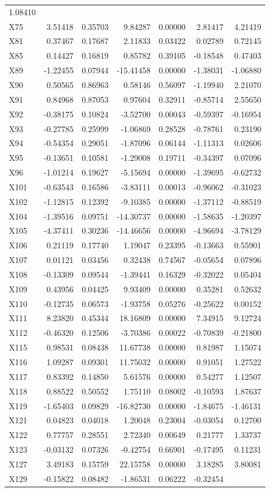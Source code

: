 \documentclass[
]{article}
\begin{document}
\begin{longtable}[]{@{}lrrrrrr@{}}
1.08410\tabularnewline
X75 & 3.51418 & 0.35703 & 9.84287 & 0.00000 & 2.81417 &
4.21419\tabularnewline
X81 & 0.37467 & 0.17687 & 2.11833 & 0.03422 & 0.02789 &
0.72145\tabularnewline
X85 & 0.14427 & 0.16819 & 0.85782 & 0.39105 & -0.18548 &
0.47403\tabularnewline
X89 & -1.22455 & 0.07944 & -15.41458 & 0.00000 & -1.38031 &
-1.06880\tabularnewline
X90 & 0.50565 & 0.86963 & 0.58146 & 0.56097 & -1.19940 &
2.21070\tabularnewline
X91 & 0.84968 & 0.87053 & 0.97604 & 0.32911 & -0.85714 &
2.55650\tabularnewline
X92 & -0.38175 & 0.10824 & -3.52700 & 0.00043 & -0.59397 &
-0.16954\tabularnewline
X93 & -0.27785 & 0.25999 & -1.06869 & 0.28528 & -0.78761 &
0.23190\tabularnewline
X94 & -0.54354 & 0.29051 & -1.87096 & 0.06144 & -1.11313 &
0.02606\tabularnewline
X95 & -0.13651 & 0.10581 & -1.29008 & 0.19711 & -0.34397 &
0.07096\tabularnewline
X96 & -1.01214 & 0.19627 & -5.15694 & 0.00000 & -1.39695 &
-0.62732\tabularnewline
X101 & -0.63543 & 0.16586 & -3.83111 & 0.00013 & -0.96062 &
-0.31023\tabularnewline
X102 & -1.12815 & 0.12392 & -9.10385 & 0.00000 & -1.37112 &
-0.88519\tabularnewline
X104 & -1.39516 & 0.09751 & -14.30737 & 0.00000 & -1.58635 &
-1.20397\tabularnewline
X105 & -4.37411 & 0.30236 & -14.46656 & 0.00000 & -4.96694 &
-3.78129\tabularnewline
X106 & 0.21119 & 0.17740 & 1.19047 & 0.23395 & -0.13663 &
0.55901\tabularnewline
X107 & 0.01121 & 0.03456 & 0.32438 & 0.74567 & -0.05654 &
0.07896\tabularnewline
X108 & -0.13309 & 0.09544 & -1.39441 & 0.16329 & -0.32022 &
0.05404\tabularnewline
X109 & 0.43956 & 0.04425 & 9.93409 & 0.00000 & 0.35281 &
0.52632\tabularnewline
X110 & -0.12735 & 0.06573 & -1.93758 & 0.05276 & -0.25622 &
0.00152\tabularnewline
X111 & 8.23820 & 0.45344 & 18.16809 & 0.00000 & 7.34915 &
9.12724\tabularnewline
X112 & -0.46320 & 0.12506 & -3.70386 & 0.00022 & -0.70839 &
-0.21800\tabularnewline
X115 & 0.98531 & 0.08438 & 11.67738 & 0.00000 & 0.81987 &
1.15074\tabularnewline
X116 & 1.09287 & 0.09301 & 11.75032 & 0.00000 & 0.91051 &
1.27522\tabularnewline
X117 & 0.83392 & 0.14850 & 5.61576 & 0.00000 & 0.54277 &
1.12507\tabularnewline
X118 & 0.88522 & 0.50552 & 1.75110 & 0.08002 & -0.10593 &
1.87637\tabularnewline
X119 & -1.65403 & 0.09829 & -16.82730 & 0.00000 & -1.84675 &
-1.46131\tabularnewline
X121 & 0.04823 & 0.04018 & 1.20048 & 0.23004 & -0.03054 &
0.12700\tabularnewline
X122 & 0.77757 & 0.28551 & 2.72340 & 0.00649 & 0.21777 &
1.33737\tabularnewline
X123 & -0.03132 & 0.07326 & -0.42754 & 0.66901 & -0.17495 &
0.11231\tabularnewline
X127 & 3.49183 & 0.15759 & 22.15758 & 0.00000 & 3.18285 &
3.80081\tabularnewline
X129 & -0.15822 & 0.08482 & -1.86531 & 0.06222 & -0.32454 &

\end{longtable}
\end{document}
